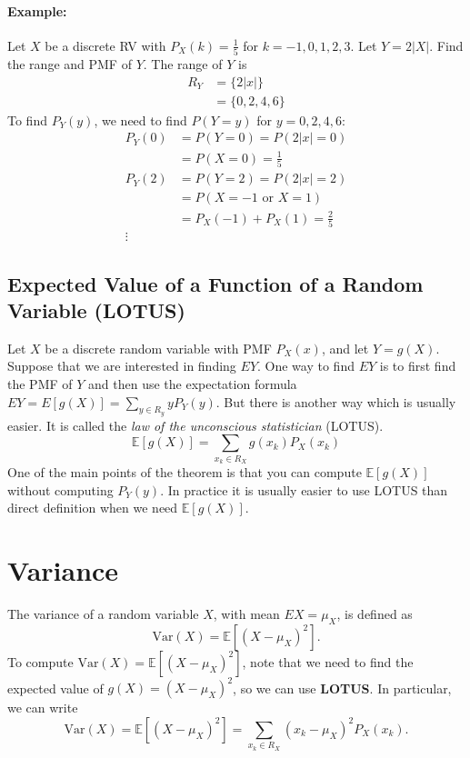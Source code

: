 \paragraph{Example:} Let $X$ be a discrete RV with $P_X(k) = \frac{1}{5}$ for $k=-1,0,1,2,3$. Let $Y=2|X|$. Find the range and PMF of $Y$.
The range of $Y$ is 
\begin{align*}
	R_Y &= \{2|x|\}\\
		&= \{0,2,4,6\}
\end{align*}
To find $P_Y(y)$, we need to find $P(Y=y)$ for $y=0,2,4,6$:
\begin{align*}
	P_Y(0) &= P(Y=0)  = P(2|x|=0)\\
		   &= P(X=0) = \frac{1}{5}\\
	P_Y(2) &= P(Y=2)  = P(2|x|=2)\\
		   &= P(X=-1 \text{ or } X=1)\\
		   &= P_X(-1) + P_X(1) = \frac{2}{5}\\
		   \vdots
\end{align*}

\subsection{Expected Value of a Function of a Random Variable (LOTUS)}

Let $X$ be a discrete random variable with PMF $P_X(x)$, and let $Y=g(X)$. Suppose that we are interested in finding $EY$. One way to find $EY$ is to first find the PMF of $Y$ and then use the expectation formula $EY=E[g(X)]=\sum_{y\in R_y}yP_Y(y)$. But there is another way which is usually easier. It is called the \textit{law of the unconscious statistician} (LOTUS).
$$\mathbb{E}[g(X)]=\sum_{x_k\in R_X}g(x_k)P_{X}(x_k)$$
One of the main points of the theorem is that you can compute $\mathbb{E}[g(X)]$ without computing $P_Y(y)$. In practice it is usually easier to use LOTUS than direct definition when we need $\mathbb{E}[g(X)]$.

\section{Variance}
The variance of a random variable $X$, with mean $EX=\mu_X$, is defined as
$$\text{Var}(X) = \mathbb{E}[(X-\mu_X)^2].$$
To compute $\text{Var}(X) = \mathbb{E}[(X-\mu_X)^2]$, note that we need to find the expected value of $g(X)=(X-\mu_X)^2$, so we can use \textbf{LOTUS}. In particular, we can write 
$$\text{Var}(X) = \mathbb{E}[(X-\mu_X)^2]= \sum_{x_k\in R_X}(x_k-\mu_X)^2P_X(x_k).$$


